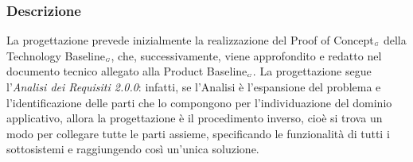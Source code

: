 \subsubsection{Descrizione}\label{ProcessiPrimariProgettazioneDescrizione}
La progettazione prevede inizialmente la realizzazione del Proof of Concept$_{\scaleto{G}{3pt}}$ della Technology Baseline$_{\scaleto{G}{3pt}}$, che, successivamente, viene approfondito e redatto nel documento tecnico allegato alla Product Baseline$_{\scaleto{G}{3pt}}$. La progettazione segue l'\textit{Analisi dei Requisiti 2.0.0}: infatti, se l'Analisi è l'espansione del problema e l'identificazione delle parti che lo compongono per l'individuazione del dominio applicativo, allora la progettazione è il procedimento inverso, cioè si trova un modo per collegare tutte le parti assieme, specificando le funzionalità di tutti i sottosistemi e raggiungendo così un'unica soluzione.
%
